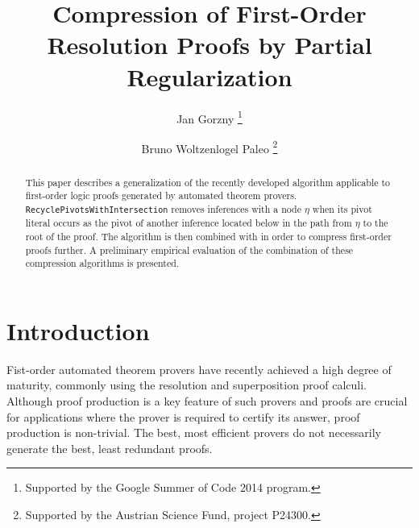 \documentclass{llncs}
\title{Compression of First-Order Resolution Proofs by Partial Regularization} %
\author{
  Jan Gorzny\inst{1}
  \thanks{Supported by the Google Summer of Code 2014 program.}
  \and 
  Bruno Woltzenlogel Paleo\inst{2}
  \thanks{Supported by the Austrian Science Fund, project P24300.}
}
\institute{
  \email{jgorzny@uvic.ca}, University of Victoria, Canada
  \and 
  \email{bruno@logic.at}, Vienna University of Technology, Austria
}
\begin{document}
\maketitle


\begin{abstract}%
This paper describes a generalization of the recently developed \RecyclePivotsIntersection algorithm applicable to first-order logic proofs generated by automated theorem provers. 
\texttt{RecyclePiv\-otsWithIntersection} removes inferences with a node $\eta$ when its pivot literal occurs as the pivot of another inference located below in the path from $\eta$ to the root of the proof. The algorithm is then combined with \SFOLowerUnits in order to compress first-order proofs further. A preliminary empirical evaluation of the combination of these compression algorithms is presented.
\end{abstract}


\setcounter{footnote}{0}

\section{Introduction}

Fist-order automated theorem provers have recently achieved a high degree of maturity, commonly using the resolution and superposition proof calculi. Although proof production is a key feature of such provers and proofs are crucial for applications where the prover is required to certify its answer, proof production is non-trivial. The best, most efficient provers do not necessarily generate the best, least redundant proofs.
\end{document}
